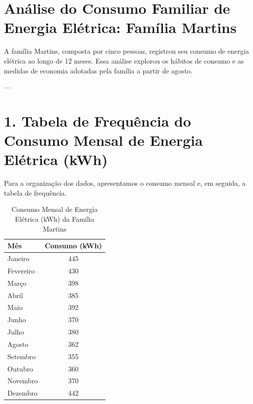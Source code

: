 \documentclass{article}
\begin{document}
\section*{Análise do Consumo Familiar de Energia Elétrica: Família Martins}

A família Martins, composta por cinco pessoas, registrou seu consumo de energia elétrica ao longo de 12 meses. Essa análise explorou os hábitos de consumo e as medidas de economia adotadas pela família a partir de agosto.

---

\section*{1. Tabela de Frequência do Consumo Mensal de Energia Elétrica (kWh)}

Para a organização dos dados, apresentamos o consumo mensal e, em seguida, a tabela de frequência.

\begin{table}[H]
    \centering
    \caption{Consumo Mensal de Energia Elétrica (kWh) da Família Martins}
    \begin{tabular}{|l|c|}
        \hline
        \textbf{Mês} & \textbf{Consumo (kWh)} \\
        \hline
        Janeiro & 445 \\
        Fevereiro & 430 \\
        Março & 398 \\
        Abril & 385 \\
        Maio & 392 \\
        Junho & 370 \\
        Julho & 380 \\
        Agosto & 362 \\
        Setembro & 355 \\
        Outubro & 360 \\
        Novembro & 370 \\
        Dezembro & 442 \\
        \hline
    \end{tabular}
\end{table}
\end{document}
